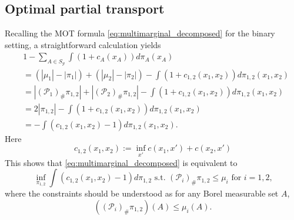 \documentclass{amsart}
\theoremstyle{plain}
\numberwithin{equation}{section}\newtheorem{theorem}{Theorem}[section]
\theoremstyle{remark}
\begin{document}
\subsection{Optimal partial transport}\label{sec: optimal partial transport}
Recalling the MOT formula \eqref{eq:multimarginal_decomposed} for the binary setting, a straightforward calculation yields
\begin{align*}
    &1 - \sum_{A\in S_\mathcal{Y}} \int \left( 1 + c_A(x_A) \right) d\pi_A(x_A)\\
    &= (|\mu_1| - |\pi_1| )+ (|\mu_2|  - |\pi_2|) - \int \left( 1 + c_{1,2}(x_1,x_2) \right) d\pi_{1,2}(x_1,x_2)\\
    &= |(\mathcal{P}_1)_\# \pi_{1,2}| + |(\mathcal{P}_2)_\# \pi_{1,2}| - \int \left( 1 + c_{1,2}(x_1,x_2) \right) d\pi_{1,2}(x_1,x_2)\\
    &= 2|\pi_{1,2}| - \int \left( 1 + c_{1,2}(x_1,x_2) \right) d\pi_{1,2}(x_1,x_2)\\
    &= - \int \left(c_{1,2}(x_1,x_2) - 1\right) d\pi_{1,2}(x_1,x_2).
\end{align*}
Here 
\begin{equation}\label{eq: c_1,2}
    c_{1,2}(x_1, x_2) := \inf_{x'} c(x_1, x') + c(x_2, x')
\end{equation}
This shows that \eqref{eq:multimarginal_decomposed} is equivalent to
\begin{equation}\label{eq: partial OT form of adversarial training}
    \inf_{\pi_{1,2}}\int \left(c_{1,2}(x_1,x_2) - 1\right) d\pi_{1,2} \text{ s.t. } (\mathcal{P}_i)_\# \pi_{1,2} \leq \mu_i \text{ for $i=1,2$,}
\end{equation}
where the constraints should be understood as for any Borel measurable set $A$,
\[
    ((\mathcal{P}_i)_\# \pi_{1,2}) (A) \leq \mu_i(A).
\]
\end{document}
